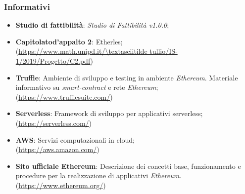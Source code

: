 \subsubsection{Informativi}
\begin{itemize}
	\item \textbf{Studio di fattibilità}: \textit{Studio di Fattibilità v1.0.0};
    \item \textbf{Capitolato\glo d'appalto 2}: Etherles;\\ 
			(\url{https://www.math.unipd.it/\textasciitilde tullio/IS-1/2019/Progetto/C2.pdf})
	\item \textbf{Truffle}:  Ambiente di sviluppo e testing in ambiente \textit{Ethereum\glos}. Materiale informativo su \textit{smart-contract\glo} e rete \textit{Ethereum\glos};
		\\ (\url{https://www.trufflesuite.com/})
	\item \textbf{Serverless}:  Framework di sviluppo per applicativi serverless;\\ (\url{https://serverless.com/})
	\item \textbf{AWS}: Servizi computazionali in cloud; \\ (\url{https://aws.amazon.com/})
	\item \textbf{Sito ufficiale Ethereum\glo}: Descrizione dei concetti base, funzionamento e procedure per la realizzazione di applicativi \textit{Ethereum\glos}.
\\ (\url {https://www.ethereum.org/})
\end{itemize}

	
	
	